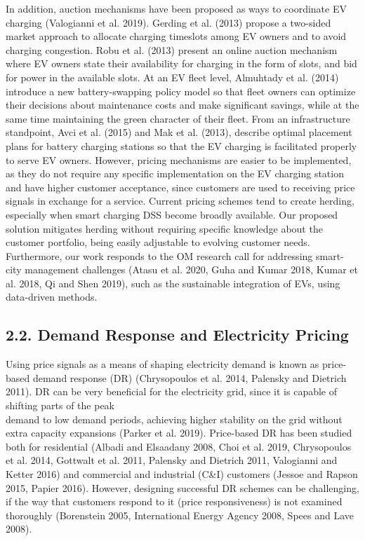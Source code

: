 \documentclass[10pt]{article}
\begin{document}
In addition, auction mechanisms have been proposed as ways to coordinate EV charging (Valogianni et al. 2019). Gerding et al. (2013) propose a two-sided market approach to allocate charging timeslots among EV owners and to avoid charging congestion. Robu et al. (2013) present an online auction mechanism where EV owners state their availability for charging in the form of slots, and bid for power in the available slots. At an EV fleet level, Almuhtady et al. (2014) introduce a new battery-swapping policy model so that fleet owners can optimize their decisions about maintenance costs and make significant savings, while at the same time maintaining the green character of their fleet. From an infrastructure standpoint, Avci et al. (2015) and Mak et al. (2013), describe optimal placement plans for battery charging stations so that the EV charging is facilitated properly to serve EV owners. However, pricing mechanisms are easier to be implemented, as they do not require any specific implementation on the EV charging station and have higher customer acceptance, since customers are used to receiving price signals in exchange for a service. Current pricing schemes tend to create herding, especially when smart charging DSS become broadly available. Our proposed solution mitigates herding without requiring specific knowledge about the customer portfolio, being easily adjustable to evolving customer needs. Furthermore, our work responds to the OM research call for addressing smart-city management challenges (Atasu et al. 2020, Guha and Kumar 2018, Kumar et al. 2018, Qi and Shen 2019), such as the sustainable integration of EVs, using data-driven methods.

\subsection*{2.2. Demand Response and Electricity Pricing}
Using price signals as a means of shaping electricity demand is known as price-based demand response (DR) (Chrysopoulos et al. 2014, Palensky and Dietrich 2011). DR can be very beneficial for the electricity grid, since it is capable of shifting parts of the peak\\
demand to low demand periods, achieving higher stability on the grid without extra capacity expansions (Parker et al. 2019). Price-based DR has been studied both for residential (Albadi and Elsaadany 2008, Choi et al. 2019, Chrysopoulos et al. 2014, Gottwalt et al. 2011, Palensky and Dietrich 2011, Valogianni and Ketter 2016) and commercial and industrial (C\&I) customers (Jessoe and Rapson 2015, Papier 2016). However, designing successful DR schemes can be challenging, if the way that customers respond to it (price responsiveness) is not examined thoroughly (Borenstein 2005, International Energy Agency 2008, Spees and Lave 2008).
\end{document}
